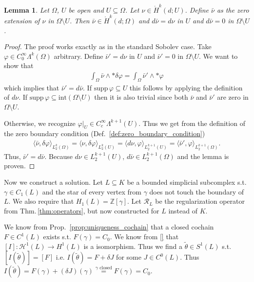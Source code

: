 \documentclass[12pt,a4paper]{article}
\numberwithin{equation}{subsection}
\newtheorem{lemma}{Lemma}[section]
\numberwithin{lemma}{subsection}
\theoremstyle{definition}
\newcommand{\integers}{\mathbb{Z}}
\newcommand{\smoothcompforms}[2]{C_0^\infty \Lambda^{#1}(#2)}
\newcommand{\rop}{\mathscr{R}} %
\begin{document}
\begin{lemma}\label{lem:extension_by_zero}
    Let $\Omega$, $U$ be open and $U \subseteq \Omega$. 
    Let $\nu \in \mathring{H}^k(d;U)$. Define $\bar{\nu}$ as the 
    zero extension of $\nu$ in $\Omega \setminus U$. 
    Then $\bar{\nu} \in \mathring{H}^k(d;\Omega)$ and 
    $d\bar{\nu} = d\nu$ in $U$ and $d\bar{\nu} = 0$ in $\Omega \setminus U$.
\end{lemma}
\begin{proof}
    The proof works exactly as in the standard Sobolev case. 
    Take $\varphi \in \smoothcompforms{k}{\Omega}$ arbitrary. 
    Define $\bar{\nu}' = d\nu$ in $U$ and $\bar{\nu}' = 0$ in 
    $\Omega \setminus U$. We want to show that 
    \begin{align*}
        \int_\Omega \bar{\nu} \wedge *\delta \varphi 
        = \int_\Omega \bar{\nu}' \wedge *\varphi
    \end{align*}
    which implies that $\bar{\nu}' = d\bar{\nu}$. If
    $\text{supp}\, \varphi \subseteq U$ this follows by applying the definition 
    of $d\nu$. If $\text{supp}\, \varphi \subseteq 
    \text{int}(\Omega \setminus U)$ then it is also trivial since both 
    $\bar{\nu}$ and $\bar{\nu}'$ are zero in $\Omega \setminus U$. 

    Otherwise, we recognize $\varphi |_U \in C_c^\infty \Lambda^{k+1}(U)$. 
    Thus we get from the definition of the zero boundary condition 
    (Def.~\ref{def:zero_boundary_condition})
    \begin{align*}
        \langle \bar{\nu}, \delta \varphi \rangle_{L^k_2(\Omega)}
        = \langle \nu, \delta \varphi \rangle_{L^k_2(U)}
        = \langle d\nu, \varphi \rangle_{L^{k+1}_2(U)}
        = \langle \bar{\nu}', \varphi \rangle_{L^{k+1}_2(\Omega)}.
    \end{align*}
    Thus, $\bar{\nu}' = d\bar{\nu}$. Because $d\nu \in L^{k+1}_2(U)$,
    $d\bar{\nu} \in L^{k+1}_2(\Omega)$ and the lemma is proven.
\end{proof}

Now we construct a solution. Let $L \subseteq K$ be a bounded
simplicial subcomplex s.t. $\gamma \in C_1(L)$ and the star of 
every vertex from $\gamma$ does not touch the boundary of $L$. 
We also require that $H_1(L) = \integers [\gamma]$.
Let $\rop_L$ be 
the regularization operator from Thm.\,\ref{thm:operators}, but now constructed for
$L$ instead of $K$.

We know from Prop.~\ref{prop:uniqueness_cochain} 
that a closed cochain $F \in C^1(L)$ 
exists s.t. $F(\gamma) = C_0$. 
We know from \ref{} that $[I]: \mathscr{H}^1(L) \rightarrow H^1(L)$ is a 
isomorphism. Thus we find a $\tilde{\theta} \in S^1(L)$ s.t. 
$[I(\tilde{\theta})] = [F]$
i.e. $I(\tilde{\theta}) = F + \delta J$ for some $J\in C^0(L)$. Thus 
$I(\tilde{\theta}) = F(\gamma) + (\delta J)(\gamma) 
\stackrel{\gamma \text{ closed}}{=} 
F(\gamma) = C_0$.
\end{document}
